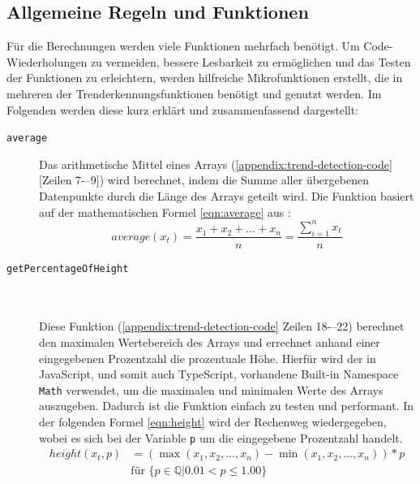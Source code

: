 \subsection{Allgemeine Regeln und Funktionen}\label{2:general_implementations}
Für die Berechnungen werden viele Funktionen mehrfach benötigt. Um Code-Wiederholungen zu vermeiden, bessere Lesbarkeit zu ermöglichen und das Testen der Funktionen zu erleichtern, werden hilfreiche Mikrofunktionen erstellt, die in mehreren der Trenderkennungsfunktionen benötigt und genutzt werden. Im Folgenden werden diese kurz erklärt und zusammenfassend dargestellt:
\begin{description}


\item[\texttt{average}] \hfill

Das arithmetische Mittel eines Arrays (\ref{appendix:trend-detection-code}[Zeilen 7-–9]) wird berechnet, indem die Summe aller übergebenen Datenpunkte durch die Länge des Arrays geteilt wird. Die Funktion basiert auf der mathematischen Formel \ref{eqn:average} aus \cite{Papula.2017}:
\begin{equation}
\label{eqn:average}
         average(x_t)=\frac{x_1+x_2+...+x_n}{n}=\frac{\sum\limits_{i=1}^nx_t}{n} 
\end{equation}

\item[\texttt{getPercentageOfHeight}] \hfill \\\\
Diese Funktion (\ref{appendix:trend-detection-code} Zeilen 18-–22) berechnet den maximalen Wertebereich des Arrays und errechnet anhand einer eingegebenen Prozentzahl die prozentuale Höhe. Hierfür wird der in JavaScript, und somit auch TypeScript, vorhandene Built-in Namespace \texttt{Math} \cite{MDNcontributors.} verwendet, um die maximalen und minimalen Werte des Arrays auszugeben. Dadurch ist die Funktion einfach zu testen und performant. In der folgenden Formel \ref{eqn:height} wird der Rechenweg wiedergegeben, wobei es sich bei der Variable \texttt{p} um die eingegebene Prozentzahl handelt.\\ 
\begin{equation}
\begin{split}
\label{eqn:height}
 height(x_t,p)&=(\max(x_1, x_2, ..., x_n) - \min(x_1, x_2, ..., x_n)) * p \\
&\text{für } \{p \in \mathbb{Q}| 0.01 < p \le 1.00 \}
\end{split}
\end{equation}


\end{description}
